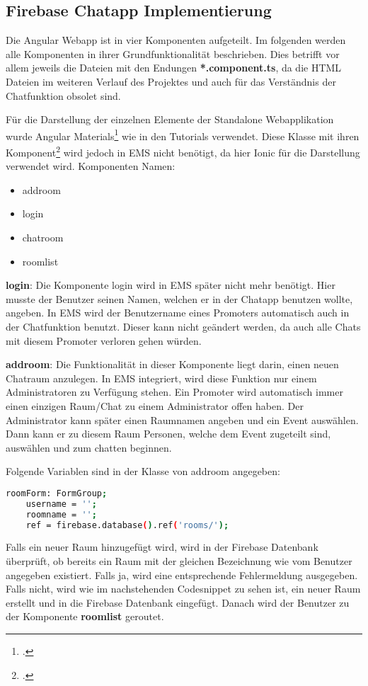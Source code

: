 \subsection{Firebase Chatapp Implementierung}
Die Angular Webapp ist in vier Komponenten aufgeteilt. Im folgenden werden alle Komponenten in ihrer Grundfunktionalität beschrieben. Dies betrifft vor allem jeweils die Dateien mit den Endungen \textbf{*.component.ts}, da die 
HTML Dateien im weiteren Verlauf des Projektes und auch für das Verständnis der Chatfunktion obsolet sind.

Für die Darstellung der einzelnen Elemente der Standalone Webapplikation wurde Angular Materials\footcite{materials} wie in den Tutorials verwendet.
Diese Klasse mit ihren Komponent\footcite{matierials-componenten} wird jedoch in EMS nicht benötigt, da hier Ionic für die Darstellung verwendet wird.
Komponenten Namen:
\begin{itemize}
	\item addroom
	\item login
	\item chatroom
	\item roomlist
\end{itemize}

\textbf{login}: Die Komponente login wird in EMS später nicht mehr benötigt. Hier musste der Benutzer seinen Namen, welchen er in der Chatapp benutzen wollte, angeben. In EMS wird der Benutzername eines Promoters automatisch
auch in der Chatfunktion benutzt. Dieser kann nicht geändert werden, da auch alle Chats mit diesem Promoter verloren gehen würden.

\textbf{addroom}: Die Funktionalität in dieser Komponente liegt darin, einen neuen Chatraum anzulegen. In EMS integriert, wird diese Funktion nur einem Administratoren zu
Verfügung stehen. Ein Promoter wird automatisch immer einen einzigen Raum/Chat zu einem Administrator offen haben. Der Administrator kann später einen Raumnamen angeben und ein Event auswählen. Dann kann er zu diesem Raum Personen,
welche dem Event zugeteilt sind, auswählen und zum chatten beginnen.

Folgende Variablen sind in der Klasse von addroom angegeben:

\begin{lstlisting}[language=bash]
    roomForm: FormGroup;
    username = '';
    roomname = '';
    ref = firebase.database().ref('rooms/');
\end{lstlisting}

Falls ein neuer Raum hinzugefügt wird, wird in der Firebase Datenbank überprüft, ob bereits ein Raum mit der gleichen Bezeichnung wie vom Benutzer angegeben existiert. Falls ja, wird eine entsprechende Fehlermeldung ausgegeben. Falls
nicht, wird wie im nachstehenden Codesnippet zu sehen ist, ein neuer Raum erstellt und in die Firebase Datenbank eingefügt. Danach wird der Benutzer zu der Komponente \textbf{roomlist} geroutet.

